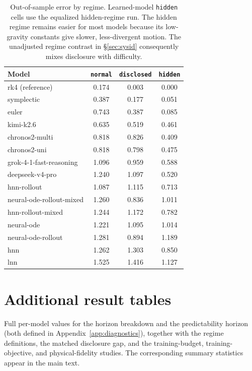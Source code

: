 \documentclass{article}
\begin{document}
\begin{table}[tbp]
\centering\small
\caption{Out-of-sample error by regime. Learned-model \texttt{hidden} cells use the
equalized hidden-regime run. The hidden regime remains easier for most models
because its low-gravity constants give slower, less-divergent motion. The unadjusted
regime contrast in \S\ref{sec:sysid} consequently mixes disclosure with difficulty.}
\label{tab:perregime}
\begin{tabular}{lccc}
\toprule
Model & \texttt{normal} & \texttt{disclosed} & \texttt{hidden} \\
\midrule
rk4 (reference) & 0.174 & 0.003 & 0.000 \\
symplectic & 0.387 & 0.177 & 0.051 \\
euler & 0.743 & 0.387 & 0.085 \\
kimi-k2.6 & 0.635 & 0.519 & 0.461 \\
chronos2-multi & 0.818 & 0.826 & 0.409 \\
chronos2-uni & 0.818 & 0.798 & 0.475 \\
grok-4-1-fast-reasoning & 1.096 & 0.959 & 0.588 \\
deepseek-v4-pro & 1.240 & 1.097 & 0.520 \\
hnn-rollout & 1.087 & 1.115 & 0.713 \\
neural-ode-rollout-mixed & 1.260 & 0.836 & 1.011 \\
hnn-rollout-mixed & 1.244 & 1.172 & 0.782 \\
neural-ode & 1.221 & 1.095 & 1.014 \\
neural-ode-rollout & 1.281 & 0.894 & 1.189 \\
hnn & 1.262 & 1.303 & 0.850 \\
lnn & 1.525 & 1.416 & 1.127 \\
\bottomrule
\end{tabular}
\end{table}

\section{Additional result tables}
\label{app:extra}
Full per-model values for the horizon breakdown and the predictability horizon (both defined
in Appendix~\ref{app:diagnostics}), together with the regime definitions, the matched
disclosure gap, and the training-budget, training-objective, and physical-fidelity studies.
The corresponding summary statistics appear in the main text.
\end{document}
